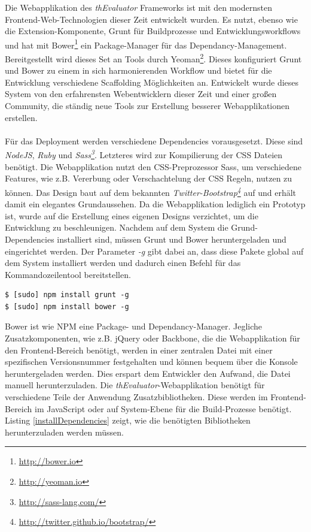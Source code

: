 Die Webapplikation des \textit{thEvaluator} Frameworks ist mit den modernsten Frontend-Web-Technologien dieser Zeit entwickelt wurden. Es nutzt, ebenso wie die Extension-Komponente, Grunt für Buildprozesse und Entwicklungsworkflows und hat mit Bower\footnote{\url{http://bower.io}} ein Package-Manager für das Dependancy-Management. Bereitgestellt wird dieses Set an Tools durch Yeoman\footnote{\url{http://yeoman.io}}. Dieses konfiguriert Grunt und Bower zu einem in sich harmonierenden Workflow und bietet für die Entwicklung verschiedene Scaffolding Möglichkeiten an. Entwickelt wurde dieses System von den erfahrensten Webentwicklern dieser Zeit und einer großen Community, die ständig neue Tools zur Erstellung besserer Webapplikationen erstellen.\\
\\
Für das Deployment werden verschiedene Dependencies vorausgesetzt. Diese sind \textit{NodeJS}, \textit{Ruby} und \textit{Sass\footnote{\url{http://sass-lang.com/}}}. Letzteres wird zur Kompilierung der CSS Dateien benötigt. Die Webapplikation nutzt den CSS-Preprozessor Sass, um verschiedene Features, wie z.B. Vererbung oder Verschachtelung der CSS Regeln, nutzen zu können. Das Design baut auf dem bekannten \textit{Twitter-Bootstrap\footnote{\url{http://twitter.github.io/bootstrap/}}} auf und erhält damit ein elegantes Grundaussehen. Da die Webapplikation lediglich ein Prototyp ist, wurde auf die Erstellung eines eigenen Designs verzichtet, um die Entwicklung zu beschleunigen. Nachdem auf dem System die Grund-Dependencies installiert sind, müssen Grunt und Bower heruntergeladen und eingerichtet werden. Der Parameter \textit{-g} gibt dabei an, dass diese Pakete global auf dem System installiert werden und dadurch einen Befehl für das Kommandozeilentool bereitstellen.

\vspace{1cm}
\begin{lstlisting}[caption=Installation von Grunt und Bower auf dem System,label=installPackages]
$ [sudo] npm install grunt -g
$ [sudo] npm install bower -g
\end{lstlisting}
\vspace{0.5cm}

Bower ist wie NPM eine Package- und Dependancy-Manager. Jegliche Zusatzkomponenten, wie z.B. jQuery oder Backbone, die die Webapplikation für den Frontend-Bereich benötigt, werden in einer zentralen Datei mit einer spezifischen Versionsnummer festgehalten und können bequem über die Konsole heruntergeladen werden. Dies erspart dem Entwickler den Aufwand, die Datei manuell herunterzuladen. Die \textit{thEvaluator}-Webapplikation benötigt für verschiedene Teile der Anwendung Zusatzbibliotheken. Diese werden im Frontend-Bereich im JavaScript oder auf System-Ebene für die Build-Prozesse benötigt. Listing \ref{installDependencies} zeigt, wie die benötigten Bibliotheken herunterzuladen werden müssen.

